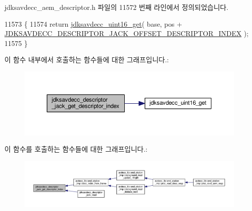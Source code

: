 jdksavdecc\+\_\+aem\+\_\+descriptor.\+h 파일의 11572 번째 라인에서 정의되었습니다.


\begin{DoxyCode}
11573 \{
11574     \textcolor{keywordflow}{return} \hyperlink{group__endian_ga3fbbbc20be954aa61e039872965b0dc9}{jdksavdecc\_uint16\_get}( base, pos + 
      \hyperlink{group__descriptor__jack_ga210f344d95a77e3222709ffe40e83968}{JDKSAVDECC\_DESCRIPTOR\_JACK\_OFFSET\_DESCRIPTOR\_INDEX} );
11575 \}
\end{DoxyCode}


이 함수 내부에서 호출하는 함수들에 대한 그래프입니다.\+:
\nopagebreak
\begin{figure}[H]
\begin{center}
\leavevmode
\includegraphics[width=350pt]{group__descriptor__jack_ga87120a7dafd647c7aa3f0903b8cf183a_cgraph}
\end{center}
\end{figure}




이 함수를 호출하는 함수들에 대한 그래프입니다.\+:
\nopagebreak
\begin{figure}[H]
\begin{center}
\leavevmode
\includegraphics[width=350pt]{group__descriptor__jack_ga87120a7dafd647c7aa3f0903b8cf183a_icgraph}
\end{center}
\end{figure}


